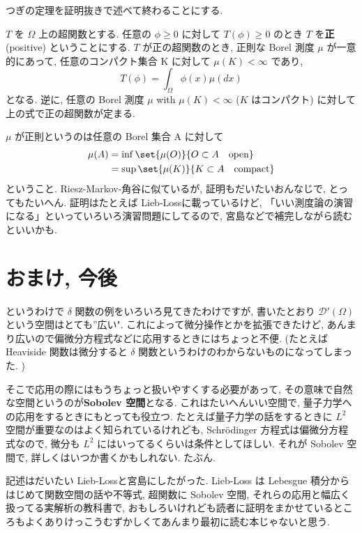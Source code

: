 \documentclass[openany, a4paper, oneside]{jsbook}
\begin{document}
つぎの定理を証明抜きで述べて終わることにする.
\begin{thm}[正の超関数は測度]
 $T$ を $\Omega$ 上の超関数とする.
 任意の $\phi \ge 0$ に対して $T (\phi) \ge 0$ のとき $T$ を\textbf{正}(positive) ということにする.
 $T$ が正の超関数のとき, 正則な Borel 測度 $\mu$ が一意的にあって,
 任意のコンパクト集合 K に対して $\mu (K) < \infty$ であり,
 \begin{equation}
  T (\phi) = \int_{\Omega}\phi (x)\mu (dx)
 \end{equation}
 となる.
 逆に, 任意の Borel 測度 $\mu$  with  $\mu (K) < \infty$ ($K$ はコンパクト) に対して上の式で正の超関数が定まる.
\end{thm}
\begin{rem}
 $\mu$ が正則というのは任意の Borel 集合 A に対して
 \begin{align}
  \mu (A)
  &=
  \inf \set{\mu (O)}{O \subset A \quad \text{open}} \\
  &=
  \sup \set{\mu (K)}{K \subset A \quad \text{compact}}
 \end{align}
 ということ.
 Riesz-Markov-角谷に似ているが, 証明もだいたいおんなじで, とってもたいへん.
 証明はたとえば Lieb-Loss\cite{LiebLoss1}に載っているけど,
 「いい測度論の演習になる」といっていろいろ演習問題にしてるので,
 宮島\cite{ShizuoMiyajima2}などで補完しながら読むといいかも.
\end{rem}
\section{おまけ, 今後}

というわけで $\delta$ 関数の例をいろいろ見てきたわけですが,
書いたとおり $\mathcal{D}'(\Omega)$ という空間はとても''広い".
これによって微分操作とかを拡張できたけど, あんまり広いので偏微分方程式などに応用するときにはちょっと不便.
(たとえば Heaviside 関数は微分すると $\delta$ 関数というわけのわからないものになってしまった. )

そこで応用の際にはもうちょっと扱いやすくする必要があって,
その意味で自然な空間というのが\textbf{Sobolev 空間}となる.
これはたいへんいい空間で, 量子力学への応用をするときにもとっても役立つ.
たとえば量子力学の話をするときに $L^2$ 空間が重要なのはよく知られているけれども,
Schr\"odinger 方程式は偏微分方程式なので,
微分も $L^2$ にはいってるくらいは条件としてほしい.
それが Sobolev 空間で, 詳しくはいつか書くかもしれない.
たぶん.

記述はだいたい Lieb-Loss\cite{LiebLoss1}と宮島\cite{ShizuoMiyajima1}にしたがった.
Lieb-Loss は Lebesgue 積分からはじめて関数空間の話や不等式,
超関数に Sobolev 空間, それらの応用と幅広く扱ってる実解析の教科書で,
おもしろいけれども読者に証明をまかせているところもよくありけっこうむずかしくてあんまり最初に読む本じゃないと思う.
\end{document}
